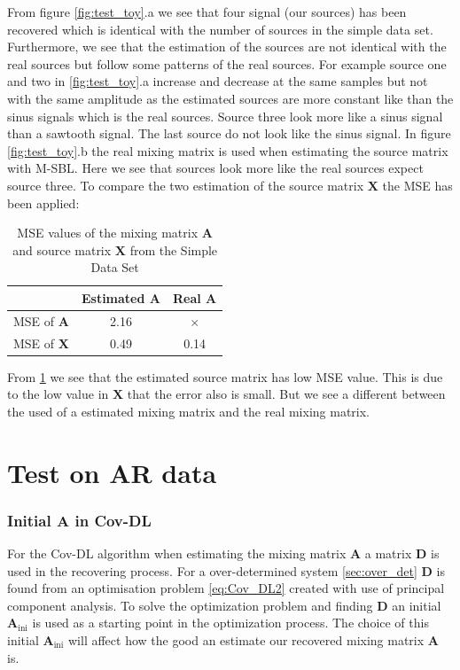 \noindent
From figure \ref{fig:test_toy}.a we see that four signal (our sources) has been recovered which is identical with the number of sources in the simple data set. Furthermore, we see that the estimation of the sources are not identical with the real sources but follow some patterns of the real sources. For example source one and two in \ref{fig:test_toy}.a increase and decrease at the same samples but not with the same amplitude as the estimated sources are more constant like than the sinus signals which is the real sources. Source three look more like a sinus signal than a sawtooth signal. The last source do not look like the sinus signal.
In figure \ref{fig:test_toy}.b the real mixing matrix is used when estimating the source matrix with M-SBL. Here we see that sources look more like the real sources expect source three.
To compare the two estimation of the source matrix $\mathbf{X}$ the MSE has been applied:
\begin{table}[H]
\centering
\begin{tabular}{|c|c|c|}
\hline
         & Estimated $\mathbf{A}$ & Real $\mathbf{A}$ \\ \hline
MSE of $\mathbf{A}$ & 2.16 & $\times$ \\ 
\hline 
MSE of $\mathbf{X}$ & 0.49 & 0.14 \\ 
\hline
\end{tabular} 
\caption{MSE values of the mixing matrix $\mathbf{A}$ and source matrix $\mathbf{X}$ from the Simple Data Set}
\label{tab:test}
\end{table}
\noindent
From \ref{tab:test} we see that the estimated source matrix has low MSE value. This is due to the low value in $\mathbf{X}$ that the error also is small. But we see a different between the used of a estimated mixing matrix and the real mixing matrix.


\section{Test on AR data}

\subsubsection{Initial A in Cov-DL}
For the Cov-DL algorithm when estimating the mixing matrix $\mathbf{A}$ a matrix $\mathbf{D}$ is used in the recovering process. For a over-determined system \ref{sec:over_det} $\mathbf{D}$ is found from an optimisation problem \eqref{eq:Cov_DL2} created with use of principal component analysis. To solve the optimization problem and finding $\mathbf{D}$ an initial $\mathbf{A}_{\text{ini}}$ is used as a starting point in the optimization process. The choice of this initial $\mathbf{A}_{\text{ini}}$ will affect how the good an estimate our recovered mixing matrix $\mathbf{A}$ is.

